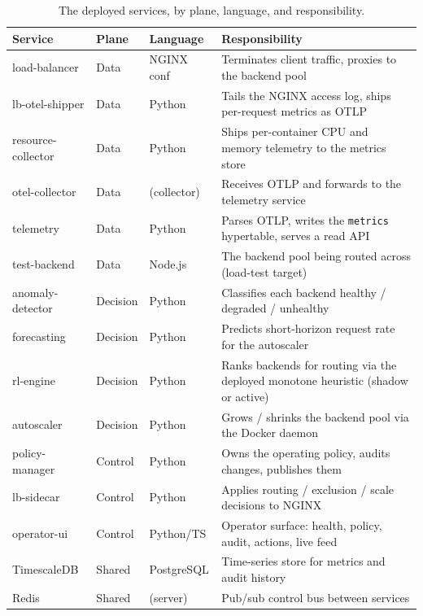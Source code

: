 \begin{table}[H]
\centering
\caption[The deployed services by plane and language]{The deployed services, by plane, language, and responsibility.}
\label{tab:ima:services}
\small
\begin{tabularx}{\linewidth}{@{}l l l Y@{}}
\toprule
\textbf{Service} & \textbf{Plane} & \textbf{Language} & \textbf{Responsibility} \\
\midrule
load-balancer    & Data    & NGINX conf & Terminates client traffic, proxies to the backend pool \\
lb-otel-shipper  & Data    & Python     & Tails the NGINX access log, ships per-request metrics as OTLP \\
resource-collector & Data  & Python     & Ships per-container CPU and memory telemetry to the metrics store \\
otel-collector   & Data    & (collector)& Receives OTLP and forwards to the telemetry service \\
telemetry        & Data    & Python     & Parses OTLP, writes the \texttt{metrics} hypertable, serves a read API \\
test-backend     & Data    & Node.js    & The backend pool being routed across (load-test target) \\
anomaly-detector & Decision& Python     & Classifies each backend healthy / degraded / unhealthy \\
forecasting      & Decision& Python     & Predicts short-horizon request rate for the autoscaler \\
rl-engine        & Decision& Python     & Ranks backends for routing via the deployed monotone heuristic (shadow or active) \\
autoscaler       & Decision& Python     & Grows / shrinks the backend pool via the Docker daemon \\
policy-manager   & Control & Python     & Owns the operating policy, audits changes, publishes them \\
lb-sidecar       & Control & Python     & Applies routing / exclusion / scale decisions to NGINX \\
operator-ui      & Control & Python/TS  & Operator surface: health, policy, audit, actions, live feed \\
\midrule
TimescaleDB      & Shared  & PostgreSQL & Time-series store for metrics and audit history \\
Redis            & Shared  & (server)   & Pub/sub control bus between services \\
\bottomrule
\end{tabularx}
\end{table}

